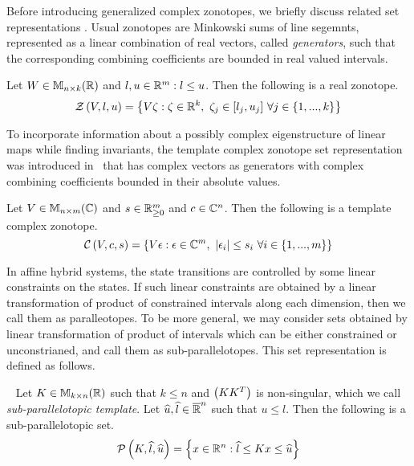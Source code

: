 Before introducing generalized complex zonotopes, we briefly discuss
related set representations .  Usual zonotopes are Minkowski sums of
line segemnts, represented as a linear combination of real vectors,
called \emph{generators}, such that the corresponding combining coefficients
are bounded in real valued intervals.
\begin{definition}
Let $W\in\mathbb{M}_{n\times k}(\mathbb{\mathbb{R}})$ and $l,u\in\mathbb{R}^m: l\leq u$.  Then the
following is a real zonotope.
\begin{equation*}
\mathcal{Z}\left(V,l,u\right) = \left\{V\zeta: \zeta\in\mathbb{R}^k,~\zeta_j\in[l_j,u_j]~\forall j\in \{1,...,k\}\right\}
\end{equation*}
\end{definition}

To incorporate information about a possibly complex eigenstructure of
linear maps while finding invariants,  the template complex zonotope
set representation was introduced in~\cite{todo} that has complex
vectors as generators with complex combining coefficients bounded in
their absolute values.
\begin{definition}
Let $V\in\mathbb{M}_{n\times m}(\mathbb{\mathbb{C}})$ and $s\in\mathbb{R}^m_{\geq 0}$ and
$c\in\mathbb{C}^n$.  Then the following is a template complex zonotope.
\begin{equation*}
\mathcal{C}\left(V,c,s\right) =
\left\{V\epsilon:\epsilon\in\mathbb{C}^m,~\left|\epsilon_i\right|\leq s_i~\forall
i\in\{1,...,m\}\right\}
\end{equation*}
\end{definition}

In affine hybrid systems, the state transitions are controlled by some
linear constraints on the states.  If such linear constraints are
obtained by a linear transformation of product of constrained
intervals along each dimension, then we call them as paralleotopes.
To be more general, we may consider sets obtained by linear
transformation of product of intervals which can be either constrained
or unconstrianed, and call them as sub-parallelotopes.  This set
representation is defined as follows.
%
\begin{definition}~\label{defn:sub-parallelotope} Let
  $K\in\mathbb{M}_{k\times n}(\mathbb{R})$ such that $k\leq n$ and $\left(KK^T\right)$ is
  non-singular, which we call \emph{sub-parallelotopic template}.  Let
  $\widehat{u},\widehat{l}\in\mathbb{\overline{R}}^n$ such that $u\leq l$.  Then the following
  is a sub-parallelotopic set.
\[
\mathcal{P}\left(K,\widehat{l},\widehat{u}\right) = \left\{x\in\mathbb{R}^n: \widehat{l}\leq Kx \leq \widehat{u}\right\}
\]
\end{definition}

